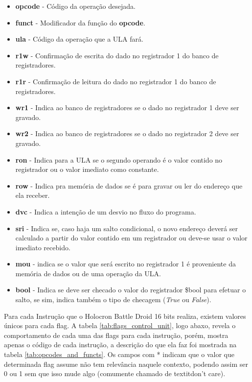 \documentclass{article}
\begin{document}
				\begin{itemize}
					\item \textbf{opcode} - C\'{o}digo da opera\c{c}\~{a}o desejada.
					\item \textbf{funct} - Modificador da fun\c{c}\~{a}o do \textbf{opcode}.
					\item \textbf{ula} - C\'{o}digo da opera\c{c}\~{a}o que a ULA far\'{a}.
					\item \textbf{r1w} - Confirma\c{c}\~{a}o de escrita do dado no registrador 1 do banco de registradores.
					\item \textbf{r1r} - Confirma\c{c}\~{a}o de leitura do dado no registrador 1 do banco de registradores.
					\item \textbf{wr1} - Indica ao banco de registradores se o dado no registrador 1 deve ser gravado.
					\item \textbf{wr2} - Indica ao banco de registradores se o dado no registrador 2 deve ser gravado.
					\item \textbf{ron} - Indica para a ULA se o segundo operando \'{e} o valor contido no registrador ou o valor imediato como constante.
					\item \textbf{row} - Indica pra mem\'{o}ria de dados se \'{e} para gravar ou ler do endere\c{c}o que ela receber.
					\item \textbf{dvc} - Indica a inten\c{c}\~{a}o de um desvio no fluxo do programa.
					\item \textbf{sri} - Indica se, caso haja um salto condicional, o novo endere\c{c}o dever\'{a} ser calculado a partir do valor contido em um registrador ou deve-se usar o valor imediato recebido.
					\item \textbf{mou} - indica se o valor que ser\'{a} escrito no registrador 1 \'{e} proveniente da mem\'{o}ria de dados ou de uma opera\c{c}\~{a}o da ULA.
					\item \textbf{bool} - Indica se deve ser checado o valor do registrador \$bool para efetuar o salto, se sim, indica tamb\'{e}m o tipo de checagem (\textit{True} ou \textit{False}).
				\end{itemize}
				Para cada Instru\c{c}\~{a}o que o Holocron Battle Droid 16 bits realiza, existem valores \'{u}nicos para cada flag. A tabela \ref{tab:flags_control_unit}, logo abaxo, revela o comportamento de cada uma das flags para cada instru\c{c}\~{a}o, por\'{e}m, mostra apenas o c\'{o}digo de cada instru\c{c}\~{a}o, a descri\c{c}\~{a}o do que ela faz foi mostrada na tabela \ref{tab:opcodes_and_functs}. Os campos com * indicam que o valor que determinada flag assume n\~{a}o tem relev\^{a}ncia naquele contexto, podendo assim ser 0 ou 1 sem que isso mude algo (comumente chamado de textit{don't care}).
				
\end{document}
